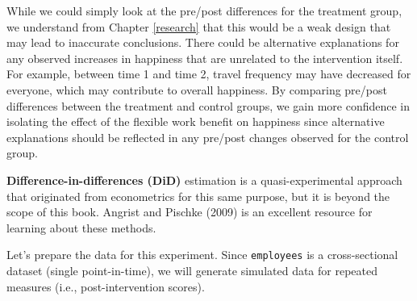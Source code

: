 \documentclass[
]{book}
\begin{document}
While we could simply look at the pre/post differences for the treatment group, we understand from Chapter \ref{research} that this would be a weak design that may lead to inaccurate conclusions. There could be alternative explanations for any observed increases in happiness that are unrelated to the intervention itself. For example, between time 1 and time 2, travel frequency may have decreased for everyone, which may contribute to overall happiness. By comparing pre/post differences between the treatment and control groups, we gain more confidence in isolating the effect of the flexible work benefit on happiness since alternative explanations should be reflected in any pre/post changes observed for the control group.

\textbf{Difference-in-differences (DiD)} estimation is a quasi-experimental approach that originated from econometrics for this same purpose, but it is beyond the scope of this book. Angrist and Pischke (2009) is an excellent resource for learning about these methods.

Let's prepare the data for this experiment. Since \texttt{employees} is a cross-sectional dataset (single point-in-time), we will generate simulated data for repeated measures (i.e., post-intervention scores).
\end{document}
